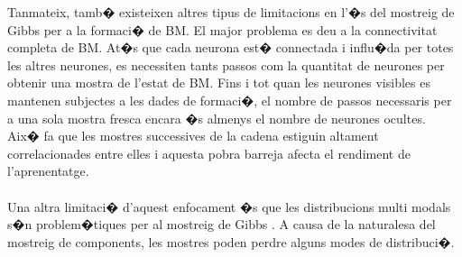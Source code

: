\documentclass[12pt,a4paper,openright,oneside]{article}
\numberwithin{equation}{section}
\theoremstyle{definition}
\begin{document}
Tanmateix, tamb� existeixen altres tipus de limitacions en l'�s del mostreig de Gibbs per a la formaci� de BM. El major problema es deu a la connectivitat completa de BM. At�s que cada neurona est� connectada i influ�da per totes les altres neurones, es necessiten tants passos com la quantitat de neurones per obtenir una mostra de l'estat de BM. Fins i tot quan les neurones visibles es mantenen subjectes a les dades de formaci�, el nombre de passos necessaris per a una sola mostra fresca encara �s almenys el nombre de neurones ocultes. Aix� fa que les mostres successives de la cadena estiguin altament correlacionades entre elles i aquesta pobra barreja afecta el rendiment de l'aprenentatge. \\\\
Una altra limitaci� d'aquest enfocament �s que les distribucions multi modals s�n problem�tiques per al mostreig de Gibbs \cite{salakhutdinov}. A causa de la naturalesa del mostreig de components, les mostres poden perdre alguns modes de distribuci�.
\end{document}
